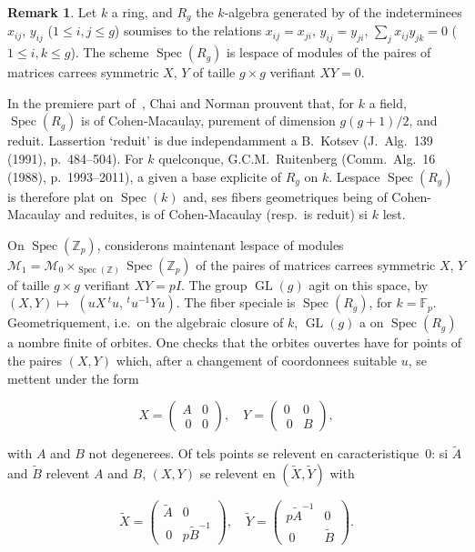 \documentclass[11pt,a4paper]{article}
\theoremstyle{plain}
\theoremstyle{definition}
\newtheorem{remark}[theorem]{Remark}
\DeclareMathOperator{\Spec}{Spec}
\DeclareMathOperator{\GL}{GL}
\begin{document}
\begin{remark}
Let $k$ a ring, and $R_g$ the $k$-algebra generated by of the
indeterminees $x_{ij}$, $y_{ij}$ ($1 \leq i, j \leq g$) soumises to the relations $x_{ij} = x_{ji}$, $y_{ij} = y_{ji}$,
$\sum_j x_{ij}y_{jk} = 0$ ($1 \leq i, k \leq g$). The scheme $\Spec(R_g)$ is lespace of modules of the
paires of matrices carrees symmetric $X$, $Y$ of taille $g \times g$ verifiant $XY = 0$.

In the premiere part of~\cite{ChaiNorman}, Chai and Norman prouvent that, for $k$ a field,
$\Spec(R_g)$ is of Cohen-Macaulay, purement of dimension $g(g+1)/2$, and reduit.
Lassertion `reduit' is due independamment a B.~Kotsev (J.~Alg.~139 (1991),
p.~484--504). For $k$ quelconque, G.C.M.~Ruitenberg (Comm.~Alg.~16 (1988),
p.~1993--2011), a given a base explicite of $R_g$ on $k$. Lespace $\Spec(R_g)$ is
therefore plat on $\Spec(k)$ and, ses fibers geometriques being of Cohen-Macaulay and
reduites, is of Cohen-Macaulay (resp.~is reduit) si $k$ lest.

On $\Spec(\mathbb{Z}_p)$, considerons maintenant lespace of modules $\mathscr{M}_1 =
\mathscr{M}_0 \times_{\Spec(\mathbb{Z})} \Spec(\mathbb{Z}_p)$ of the paires of matrices carrees symmetric $X$, $Y$ of taille
$g \times g$ verifiant $XY = pI$. The group $\GL(g)$ agit on this space, by $(X, Y) \mapsto$
$(uX\,\!^t u, \,\!^t u^{-1}Yu)$. The fiber speciale is $\Spec(R_g)$, for $k = \mathbb{F}_p$. Geometriquement,
i.e.~on the algebraic closure of $k$, $\GL(g)$ a on $\Spec(R_g)$ a nombre finite of orbites.
One checks that the orbites ouvertes have for points of the paires $(X, Y)$ which, after
a changement of coordonnees suitable $u$, se mettent under the form

\begin{equation}
X = \begin{pmatrix} A & 0 \\\ 0 & 0 \end{pmatrix}, \quad Y = \begin{pmatrix} 0 & 0 \\\ 0 & B \end{pmatrix},
\end{equation}

with $A$ and $B$ not degenerees. Of tels points se relevent en caracteristique~0: si
$\tilde{A}$ and $\tilde{B}$ relevent $A$ and $B$, $(X, Y)$ se relevent en $(\tilde{X}, \tilde{Y})$ with

\begin{equation}
\tilde{X} = \begin{pmatrix} \tilde{A} & 0 \\\ 0 & p\tilde{B}^{-1} \end{pmatrix}, \quad \tilde{Y} = \begin{pmatrix} p\tilde{A}^{-1} & 0 \\\ 0 & \tilde{B} \end{pmatrix}.
\end{equation}


\end{remark}
\end{document}
